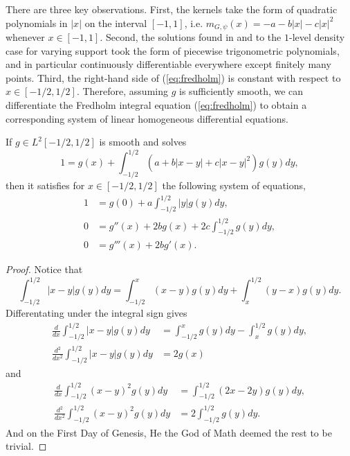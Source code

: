 There are three key observations. First, the kernels take the form of quadratic polynomials in $|x|$ on the interval $[-1, 1]$, i.e. $m_{G, \psi} (x) = -a - b |x| - c |x|^2$ whenever $x \in [-1, 1]$. Second, the solutions found in \cite{FreemanMiller} and \cite{ILS} to the $1$-level density case for varying support took the form of piecewise trigonometric polynomials, and in particular continuously differentiable everywhere except finitely many points. Third, the right-hand side of (\ref{eq:fredholm}) is constant with respect to $x \in [-1/2, 1/2]$. Therefore, assuming $g$ is sufficiently smooth, we can differentiate the Fredholm integral equation (\ref{eq:fredholm}) to obtain a corresponding system of linear homogeneous differential equations. 

\begin{lemma}
	If $g \in L^2 [-1/2, 1/2]$ is smooth and solves
		\begin{equation}
			1 = g(x) + \int_{-1/2}^{1/2} (a + b |x - y| + c |x - y|^2) g(y) dy, 	\label{eq:fredholmquad}
		\end{equation}
	then it satisfies for $x \in [-1/2, 1/2]$ the following system of equations,  
	\begin{align}
		1
			&= g(0) + a \int_{-1/2}^{1/2} |y| g(y) dy, \label{eq:diff1}\\
		0 
			&= g'' (x) + 2b g(x) + 2c \int_{-1/2}^{1/2} g(y) dy, \label{eq:diff2} \\
		0
			&= g''' (x) + 2b g'(x).		\label{eq:diff3}	
	\end{align}
\end{lemma}

\begin{proof}
	Notice that 
	\[  \int_{-1/2}^{1/2} |x - y| g(y) dy = \int_{-1/2}^x (x - y) g(y) dy + \int_x^{1/2} (y - x) g(y) dy. \]
Differentating under the integral sign gives	
	\begin{align*}
		\frac{d}{dx}  \int_{-1/2}^{1/2} |x - y| g(y) dy 
			&= \int_{-1/2}^x g(y) dy - \int_x^{1/2} g(y) dy, \\
		\frac{d^2}{dx^2}  \int_{-1/2}^{1/2} |x - y| g(y) dy 
			&= 2g(x)		
	\end{align*}
	and
	\begin{align*}
		\frac{d}{dx} \int_{-1/2}^{1/2} (x - y)^2 g(y) dy
			&= \int_{-1/2}^{1/2} (2x - 2y) g(y) dy, \\
		\frac{d^2}{dx^2} \int_{-1/2}^{1/2} (x - y)^2 g(y) dy
			&= 2 \int_{-1/2}^{1/2} g(y) dy.
	\end{align*}
	And on the First Day of Genesis, He the God of Math deemed the rest to be trivial. 
\end{proof}

